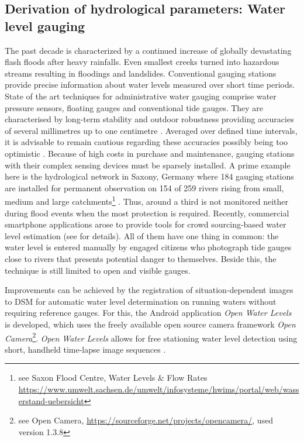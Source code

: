 \documentclass[review]{elsarticle}
\begin{document}
\subsection{Derivation of hydrological parameters: Water level gauging}
\label{sec:water_level_gauging_intro}
The past decade is characterized by a continued increase of globally devastating flash floods after heavy rainfalls. Even smallest creeks turned into hazardous streams resulting in floodings and landslides. Conventional gauging stations provide precise information about water levels measured over short time periods. State of the art techniques for administrative water gauging comprise water pressure sensors, floating gauges and conventional tide gauges. They are characterised by long-term stability and outdoor robustness providing accuracies of several millimetres up to one centimetre \cite{Siedschlag2015}. Averaged over defined time intervals, it is advisable to remain cautious regarding these accuracies possibly being too optimistic \cite{Horner2018}. Because of high costs in purchase and maintenance, gauging stations with their complex sensing devices must be sparsely installed. A prime example here is the hydrological network in Saxony, Germany where 184 gauging stations are installed for permanent observation on 154 of 259 rivers rising from small, medium and large catchments\footnote{see Saxon Flood Centre, Water Levels \& Flow Rates \url{https://www.umwelt.sachsen.de/umwelt/infosysteme/hwims/portal/web/wasserstand-uebersicht}} \cite{Buettner2015}. Thus, around a third is not monitored neither during flood events when the most protection is required. Recently, commercial smartphone applications arose to provide tools for crowd sourcing-based water level estimation (see \cite{CrowdWaterApp2017a,Kisters2014} for details). All of them have one thing in common: the water level is entered manually by engaged citizens who photograph tide gauges close to rivers that presents potential danger to themselves. Beside this, the technique is still limited to open and visible gauges.

Improvements can be achieved by the registration of situation-dependent images to \gls{DSM} for automatic water level determination on running waters without requiring reference gauges. 
For this, the Android application \textit{Open Water Levels} is developed, which uses the freely available open source camera framework \textit{Open Camera}\footnote{see Open Camera, \url{https://sourceforge.net/projects/opencamera/}, used version 1.3.8}. \textit{Open Water Levels} allows for free stationing water level detection using short, handheld time-lapse image sequences \cite{Kroehnert2017a}. 
\end{document}
